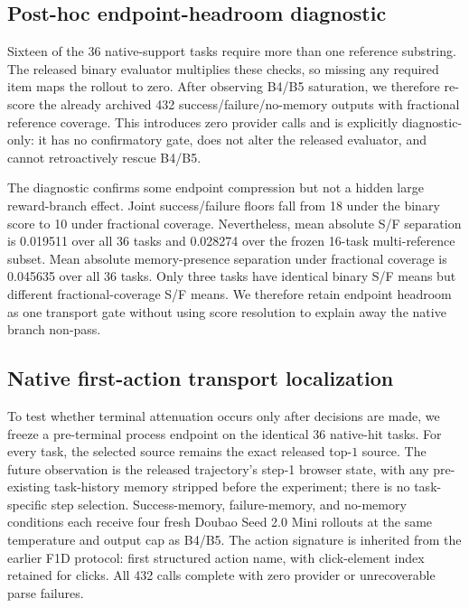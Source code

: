 \subsection{Post-hoc endpoint-headroom diagnostic}
Sixteen of the 36 native-support tasks require more than one reference substring. The released binary evaluator multiplies these checks, so missing any required item maps the rollout to zero. After observing B4/B5 saturation, we therefore re-score the already archived 432 success/failure/no-memory outputs with fractional reference coverage. This introduces zero provider calls and is explicitly diagnostic-only: it has no confirmatory gate, does not alter the released evaluator, and cannot retroactively rescue B4/B5.

The diagnostic confirms some endpoint compression but not a hidden large reward-branch effect. Joint success/failure floors fall from 18 under the binary score to 10 under fractional coverage. Nevertheless, mean absolute S/F separation is 0.019511 over all 36 tasks and 0.028274 over the frozen 16-task multi-reference subset. Mean absolute memory-presence separation under fractional coverage is 0.045635 over all 36 tasks. Only three tasks have identical binary S/F means but different fractional-coverage S/F means. We therefore retain endpoint headroom as one transport gate without using score resolution to explain away the native branch non-pass.

\subsection{Native first-action transport localization}
To test whether terminal attenuation occurs only after decisions are made, we freeze a pre-terminal process endpoint on the identical 36 native-hit tasks. For every task, the selected source remains the exact released top-$1$ source. The future observation is the released trajectory's step-1 browser state, with any pre-existing task-history memory stripped before the experiment; there is no task-specific step selection. Success-memory, failure-memory, and no-memory conditions each receive four fresh Doubao Seed 2.0 Mini rollouts at the same temperature and output cap as B4/B5. The action signature is inherited from the earlier F1D protocol: first structured action name, with click-element index retained for clicks. All 432 calls complete with zero provider or unrecoverable parse failures.

